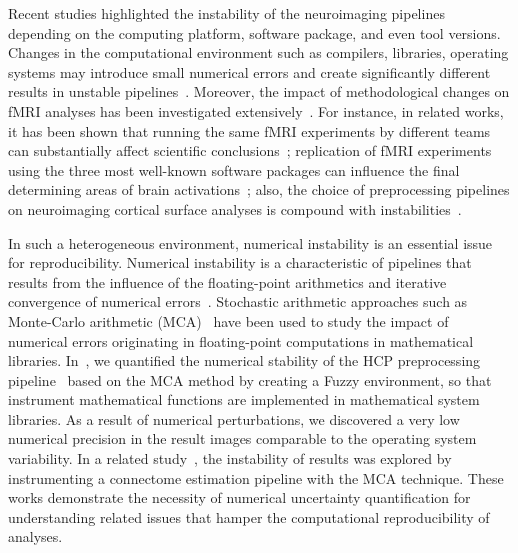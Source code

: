 \documentclass[conference]{IEEEtran}
\begin{document}
Recent studies highlighted the instability of the neuroimaging pipelines depending on the computing platform,
software package, and even tool versions. Changes in the computational
environment such as compilers, libraries, operating systems may introduce small numerical errors and create
significantly different results in unstable pipelines~\cite{Glatard2015,Gronenschild2012,salari2020spot}.
Moreover, the impact of methodological changes on fMRI analyses has been investigated extensively~\cite{bowring2019exploring,botvinik2020variability,bhagwat2021understanding,carp2012plurality}.
For instance, in related works, it has been shown that running the same fMRI experiments by different teams can substantially affect
scientific conclusions~\cite{botvinik2020variability,carp2012plurality};
replication of fMRI experiments using the three most well-known software packages can influence the final determining areas of
brain activations~\cite{bowring2019exploring}; %
also, the choice of preprocessing pipelines on neuroimaging cortical surface analyses is compound with instabilities~\cite{bhagwat2021understanding}.

In such a heterogeneous environment, numerical instability is an essential issue for reproducibility.
Numerical instability is a characteristic of pipelines that results from the influence of the floating-point arithmetics
and iterative convergence of numerical errors~\cite{freitas2002issue}.
Stochastic arithmetic approaches such as Monte-Carlo arithmetic (MCA)~\cite{Parker1997-qq} have been used to study the impact of numerical errors
originating in floating-point computations in mathematical libraries.
In~\cite{salari2021accurate}, we quantified the numerical stability of the HCP preprocessing pipeline~\cite{glasser2013} based on the MCA method
by creating a Fuzzy environment, so that instrument mathematical functions are implemented in mathematical system libraries.
As a result of numerical perturbations, we discovered a very low numerical precision in the result images comparable to the operating system variability.
In a related study~\cite{kiar2020numerical}, the instability of results was explored by instrumenting a connectome estimation pipeline with the MCA technique.
These works demonstrate the necessity of numerical uncertainty quantification for understanding related issues that hamper the computational reproducibility of analyses.
\end{document}
